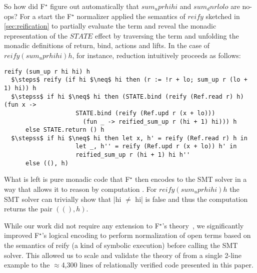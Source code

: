 \documentclass[sigplan,screen]{acmart}\settopmatter{}
\newcommand\fstar{F$^\star$\xspace}
\newcommand{\comm}[3]{\ifcheckpagebudget\else\ifdraft{\maybecolor{#1}[#2: #3]}\fi\fi}
\newcommand{\ch}[1]{\comm{teal}{CH}{#1}}
\begin{document}



%
So how did \fstar{} figure out automatically that \ls$sum_up r hi hi$
and \ls$sum_dn r lo lo$ are no-ops?
%
For a start the \fstar{} normalizer applied the semantics of
\ls$reify$ sketched in \autoref{sec:reification} to partially evaluate the
term and reveal the monadic
representation of the \ls$STATE$ effect by traversing the term and
unfolding the monadic definitions of return, bind, actions and lifts.
%
In the case of \ls$reify (sum_up r hi hi) h$, for instance, reduction
intuitively proceeds as follows:
%
\begin{lstlisting}
reify (sum_up r hi hi) h 
  $\steps$ reify (if hi $\neq$ hi then (r := !r + lo; sum_up r (lo + 1) hi)) h
  $\stepss$ if hi $\neq$ hi then (STATE.bind (reify (Ref.read r) h) (fun x ->
                    STATE.bind (reify (Ref.upd r (x + lo))) 
                      (fun _ -> reified_sum_up r (hi + 1) hi))) h
      else STATE.return () h
  $\stepss$ if hi $\neq$ hi then let x, h' = reify (Ref.read r) h in
                    let _, h'' = reify (Ref.upd r (x + lo)) h' in
                    reified_sum_up r (hi + 1) hi h''
      else ((), h)
\end{lstlisting}

What is left is pure monadic code that \fstar{} then encodes to
the SMT solver in a way that allows it to reason by
computation \cite{AlejandroHKS16}.
%
For \ls$reify (sum_up r hi hi) h$ the SMT solver can
trivially show that \ls|hi $\neq$ hi| is false and thus the
computation returns the pair \ls$((), h)$.

While our work did not require any extension to \fstar{}'s
theory~\cite{dm4free}, we significantly improved \fstar{}'s logical
encoding to perform normalization of open terms based on the semantics
of reify (a kind of symbolic execution) before calling the SMT
solver. This allowed us to scale and validate the theory of
\citet{dm4free} from a single 2-line example to the $\approx$4,300
lines of relationally verified code presented in this paper.
\end{document}
